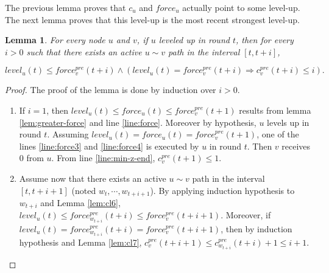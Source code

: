 \documentclass[11pt,letterpaper]{article}
\newtheorem{lem}[thm]{Lemma}
\begin{document}
The previous lemma proves that $c_u$ and $force_u$ actually point to some level-up.
The next lemma proves that this level-up is the most recent strongest level-up.
\begin{lem} \label{lem:strongest}
	For every node $u$ and $v$, if $u$ leveled up in round $t$,
	then for every $i > 0$ such that there exists an active $u \sim v$ path in the interval $[t,t+i]$,

	$$level_u(t) \leq force_v^{pre}(t+i) \wedge (level_u(t) = force_v^{pre}(t+i) \Rightarrow c^{pre}_v(t+i) \leq i).$$

\end{lem}
\begin{proof}
	\noindent The proof of the lemma is done by induction over $i > 0$.
	\begin{enumerate}
		\item If $i = 1$, then $level_u(t) \leq force_u(t) \leq force_v^{pre}(t+1)$ results from lemma \ref{lem:greater-force} and line \ref{line:force}.
			Moreover by hypothesis, $u$ levels up in round $t$.
			Assuming $level_u(t) = force_u(t) = force_v^{pre}(t+1)$, one of the lines \ref{line:force3} and \ref{line:force4} is executed by $u$ in round $t$.
			Then $v$ receives 0 from $u$. From line \ref{line:min-z-end}, $c^{pre}_v(t+1) \leq 1$.
		\item Assume now that there exists an active $u \sim v$ path in the interval $[t,t+i+1]$ (noted $w_t, \cdots, w_{t+i+1}$).
			By applying induction hypothesis to $w_{t+i}$ and Lemma \ref{lem:cl6}, $level_u(t) \leq force_{w_{t+i}}^{pre}(t+i) \leq force_v^{pre}(t+i+1)$.
			Moreover, if $level_u(t) = force_{w_{t+i}}^{pre}(t+i) = force_v^{pre}(t+i+1)$,
			then by induction hypothesis and Lemma \ref{lem:cl7}, $c^{pre}_v(t+i+1) \leq c_{w_{t+i}}^{pre}(t+i) + 1 \leq i + 1$.
	\end{enumerate}
\end{proof}
\end{document}

